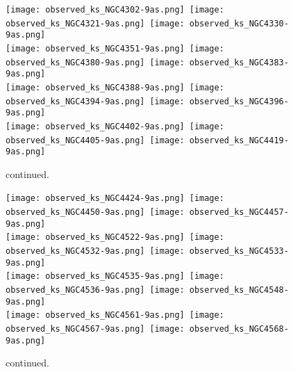 \documentclass[longauth]{aa}
\begin{document}
\begin{appendix}
\renewcommand\thefigure{\thesection.\arabic{figure}}
\setcounter{figure}{0}

\begin{figure*}
\texttt{[image: observed\_ks\_NGC4302-9as.png]}\,
\texttt{[image: observed\_ks\_NGC4321-9as.png]}\,
\texttt{[image: observed\_ks\_NGC4330-9as.png]}\\

\texttt{[image: observed\_ks\_NGC4351-9as.png]}\,
\texttt{[image: observed\_ks\_NGC4380-9as.png]}\,
\texttt{[image: observed\_ks\_NGC4383-9as.png]}\\

\texttt{[image: observed\_ks\_NGC4388-9as.png]}\,
\texttt{[image: observed\_ks\_NGC4394-9as.png]}\,
\texttt{[image: observed\_ks\_NGC4396-9as.png]}\\

\texttt{[image: observed\_ks\_NGC4402-9as.png]}\,
\texttt{[image: observed\_ks\_NGC4405-9as.png]}\,
\texttt{[image: observed\_ks\_NGC4419-9as.png]}\\

\caption{continued.}
\end{figure*}

\renewcommand\thefigure{\thesection.\arabic{figure}}
\setcounter{figure}{0}

\begin{figure*}
\texttt{[image: observed\_ks\_NGC4424-9as.png]}\,
\texttt{[image: observed\_ks\_NGC4450-9as.png]}\,
\texttt{[image: observed\_ks\_NGC4457-9as.png]}\\

\texttt{[image: observed\_ks\_NGC4522-9as.png]}\,
\texttt{[image: observed\_ks\_NGC4532-9as.png]}\,
\texttt{[image: observed\_ks\_NGC4533-9as.png]}\\

\texttt{[image: observed\_ks\_NGC4535-9as.png]}\,
\texttt{[image: observed\_ks\_NGC4536-9as.png]}\,
\texttt{[image: observed\_ks\_NGC4548-9as.png]}\\

\texttt{[image: observed\_ks\_NGC4561-9as.png]}\,
\texttt{[image: observed\_ks\_NGC4567-9as.png]}\,
\texttt{[image: observed\_ks\_NGC4568-9as.png]}\\

\caption{continued.}
\end{figure*}


\end{appendix}
\end{document}

